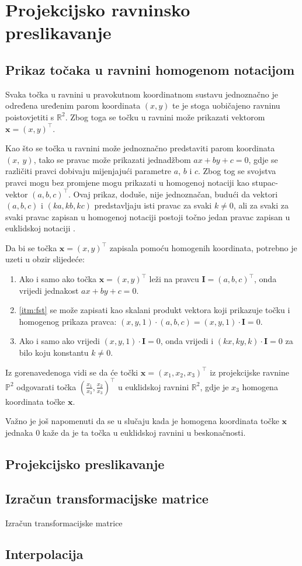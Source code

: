 \chapter{Projekcijsko ravninsko preslikavanje}

\section{Prikaz točaka u ravnini homogenom notacijom}

Svaka točka u ravnini u pravokutnom koordinatnom sustavu jednoznačno je određena uređenim parom koordinata $(x, y)$ te je stoga uobičajeno ravninu poistovjetiti s $\mathbb{R}^2$. Zbog toga se točku u ravnini može prikazati vektorom $\textbf{x} = (x, y)^\top$.

Kao što se točka u ravnini može jednoznačno predstaviti  parom koordinata $(x,~y)$, tako se pravac može prikazati jednadžbom $ax + by + c = 0$, gdje se različiti pravci dobivaju mijenjajući parametre $a$, $b$ i $c$. Zbog tog se svojstva pravci mogu bez promjene mogu prikazati u homogenoj notaciji kao stupac-vektor $(a, b, c)^\top$. Ovaj prikaz, doduše, nije jednoznačan, budući da vektori $(a, b, c)$ i $(ka, kb, kc)$ predstavljaju isti pravac za svaki $k \neq 0$, ali za svaki za svaki pravac zapisan u homogenoj notaciji postoji točno jedan pravac zapisan u euklidskoj notaciji \citep{Hartley2004}.

Da bi se točka $\textbf{x} = (x, y)^\top$ zapisala pomoću homogenih koordinata, potrebno je uzeti u obzir slijedeće:
\begin{enumerate}
	\item \label{itm:fst} Ako i samo ako točka $\textbf{x} = (x, y)^\top$ leži na pravcu $\textbf{I} =(a, b, c)^\top$, onda vrijedi jednakost $ax + by + c = 0$.
	\item \ref{itm:fst} se može zapisati kao skalani produkt vektora koji prikazuje točku i homogenog prikaza pravca: $(x, y, 1) \cdot (a, b, c) = (x, y, 1) \cdot \textbf{I} = 0$.
	\item Ako i samo ako vrijedi $(x, y, 1) \cdot \textbf{I} = 0$, onda vrijedi i  $(kx, ky, k) \cdot \textbf{I} = 0$ za bilo koju konstantu $k \neq 0$.
\end{enumerate}

Iz gorenavedenoga vidi se da će točki $\textbf{x} = (x_1, x_2, x_3)^\top$ iz projekcijske ravnine $\mathbb{P}^2$ odgovarati točka $(\frac{x_1}{x_3}, \frac{x_2}{x_3})^\top$ u euklidskoj ravnini $\mathbb{R}^2$, gdje je $x_3$ homogena koordinata točke $\textbf{x}$.

Važno je još napomenuti da se u slučaju kada je homogena koordinata točke $\textbf{x}$ jednaka $0$ kaže da je ta točka u euklidskoj ravnini u beskonačnosti.

\section{Projekcijsko preslikavanje}

\section{Izračun transformacijske matrice}
Izračun transformacijske matrice

\section{Interpolacija}